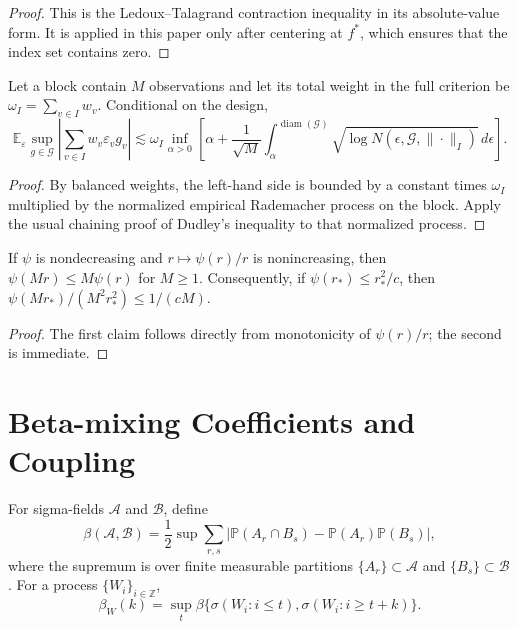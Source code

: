 \documentclass[twoside,11pt]{article}
\newenvironment{revision}{\color{revisionred}}{}
\begin{document}
\begin{revision}
\begin{proof}
This is the Ledoux--Talagrand contraction inequality in its absolute-value
form.  It is applied in this paper only after centering at $f^*$, which ensures
that the index set contains zero.
\end{proof}

\begin{lemma}
\label{app:lem:dudley-weighted}
Let a block contain $M$ observations and let its total weight in the full
criterion be $\omega_I=\sum_{v\in I}w_v$.  Conditional on the design,
\[
 \mathbb E_\varepsilon\sup_{g\in\mathcal G}
 \left|\sum_{v\in I}w_v\varepsilon_vg_v\right|
 \lesssim \omega_I\inf_{\alpha>0}\left[
 \alpha+\frac1{\sqrt M}\int_\alpha^{\operatorname{diam}(\mathcal G)}
 \sqrt{\log N(\epsilon,\mathcal G,\|\cdot\|_I)}\,d\epsilon
 \right].
\]
\end{lemma}

\begin{proof}
By balanced weights, the left-hand side is bounded by a constant times
$\omega_I$ multiplied by the normalized empirical Rademacher process on the
block.  Apply the usual chaining proof of Dudley's inequality to that
normalized process.
\end{proof}

\begin{lemma}
\label{app:lem:subroot}
If $\psi$ is nondecreasing and $r\mapsto\psi(r)/r$ is nonincreasing, then
$\psi(Mr)\le M\psi(r)$ for $M\ge1$.  Consequently, if
$\psi(r_*)\le r_*^2/c$, then
$\psi(Mr_*)/(M^2r_*^2)\le1/(cM)$.
\end{lemma}

\begin{proof}
The first claim follows directly from monotonicity of $\psi(r)/r$; the second
is immediate.
\end{proof}


\section{Beta-mixing Coefficients and Coupling}
\label{beta_mix_intro}

For sigma-fields $\mathcal A$ and $\mathcal B$, define
\begin{equation}
 \beta(\mathcal A,\mathcal B)
 =\frac12\sup\sum_{r,s}
 |\mathbb P(A_r\cap B_s)-\mathbb P(A_r)\mathbb P(B_s)|,         \label{app:eq:beta-fields}
\end{equation}
where the supremum is over finite measurable partitions
$\{A_r\}\subset\mathcal A$ and $\{B_s\}\subset\mathcal B$.  For a process
$\{W_i\}_{i\in\mathbb Z}$,
\begin{equation}
 \beta_W(k)=\sup_t
 \beta\{\sigma(W_i:i\le t),\sigma(W_i:i\ge t+k)\}.            \label{app:eq:beta-process}
\end{equation}


\end{revision}
\end{document}
